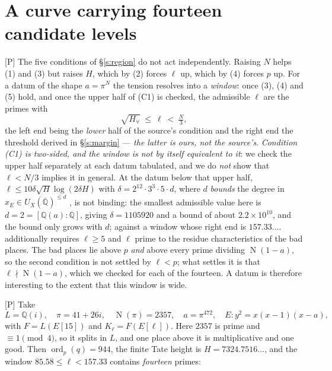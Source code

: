 \documentclass[11pt]{article}
\theoremstyle{plain}
\theoremstyle{definition}
\newcommand{\ord}{\operatorname{ord}}
\newcommand{\Norm}{\operatorname{N}}
\begin{document}
\section{A curve carrying fourteen candidate levels}\label{s:fourteen}

\textup{[P]} The five conditions of \S\ref{s:region} do not act independently.  Raising
$N$ helps (1) and (3) but raises $H$, which by (2) forces $\ell$ up, which by (4)
forces $p$ up.  For a datum of the shape $a=\pi^N$ the tension resolves into a
\emph{window}: once (3), (4) and (5) hold, and once the upper half of (C1) is checked,
the admissible $\ell$ are the primes with
\[
  \sqrt{H_\forall}\ \le\ \ell\ <\ \tfrac{N}{3},
\]
the left end being the \emph{lower} half of the source's condition
\cite[Cor.~2.2(ii), (C1)]{IUT4} and the right end the threshold derived in
\S\ref{s:margin} --- \emph{the latter is ours, not the source's}.  \emph{Condition (C1)
is two-sided, and the window is not by itself equivalent to it}: we check the upper half
separately at each datum tabulated, and we do \emph{not} show that $\ell<N/3$ implies it
in general.  At the datum below that upper half,
$\ell\le10\delta\sqrt H\log(2\delta H)$ with
$\delta=2^{12}\cdot3^{3}\cdot5\cdot d$, where $d$ \emph{bounds} the degree in
$x_E\in U_X(\overline{\mathbb Q})^{\le d}$ \cite[Cor.~2.2]{IUT4}, is not binding: the
smallest admissible value here is $d=2=[\mathbb{Q}(a):\mathbb{Q}]$, giving
$\delta=1105920$ and a bound of about $2.2\times10^{10}$, and the bound only grows
with $d$; against a window whose right end is $157.33\ldots$.  \cite[Def.~3.1(c)]{IUT1} additionally requires
$\ell\ge5$ and $\ell$ prime to the residue characteristics of the bad places.  The
bad places lie above $p$ \emph{and} above every prime dividing $\Norm(1-a)$, so the
second condition is not settled by $\ell<p$; what settles it is that
$\ell\nmid\Norm(1-a)$, which we checked for each of the fourteen.  A datum is therefore interesting to the extent that this window
is wide.

\textup{[P]} Take
\[
  L=\mathbb{Q}(i),\quad \pi=41+26i,\quad \Norm(\pi)=2357,\quad a=\pi^{472},\quad
  E:y^2=x(x-1)(x-a),
\]
with $F=L(E[15])$ and $K_\ell=F(E[\ell])$.  Here $2357$ is prime and $\equiv1\pmod4$,
so it splits in $L$, and one place above it is multiplicative and one good.  Then
$\ord_p(q)=944$, the finite Tate height is $H=7324.7516\ldots$, and the window
$85.58\le\ell<157.33$ contains \emph{fourteen} primes:
\end{document}
